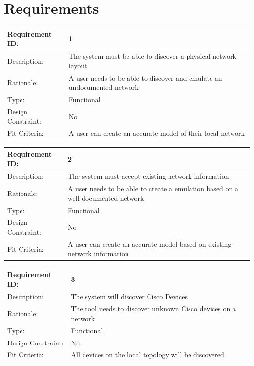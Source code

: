 \documentclass[11pt]{report}
\begin{document}
\section{Requirements}

\begin{tabular}{|l|p{12cm}|}
	\hline Requirement ID: & 1 \\ 
	\hline Description: & The system must be able to discover a physical network layout \\ 
	\hline Rationale: & A user needs to be able to discover and emulate an undocumented network \\ 
	\hline Type: & Functional \\ 
	\hline Design Constraint: & No \\ 
	\hline Fit Criteria: & A user can create an accurate model of their local network \\ 
	\hline 
\end{tabular}
\newline
\vspace*{0.5 cm}
\newline
\begin{tabular}{|l|p{12cm}|}
	\hline Requirement ID: & 2 \\ 
	\hline Description: & The system must accept existing network information \\ 
	\hline Rationale: & A user needs to be able to create a emulation based on a well-documented network \\ 
	\hline Type: & Functional \\ 
	\hline Design Constraint: & No \\ 
	\hline Fit Criteria: & A user can create an accurate model based on existing network information \\ 
	\hline 
\end{tabular} 
\newline
\vspace*{0.5 cm}
\newline
\begin{tabular}{|l|p{12cm}|}
	\hline Requirement ID: & 3 \\ 
	\hline Description: & The system will discover Cisco Devices \\ 
	\hline Rationale: & The tool needs to discover unknown Cisco devices on a network \\ 
	\hline Type: & Functional \\ 
	\hline Design Constraint: & No \\ 
	\hline Fit Criteria: & All devices on the local topology will be discovered \\ 
	\hline 
\end{tabular}
\end{document}
